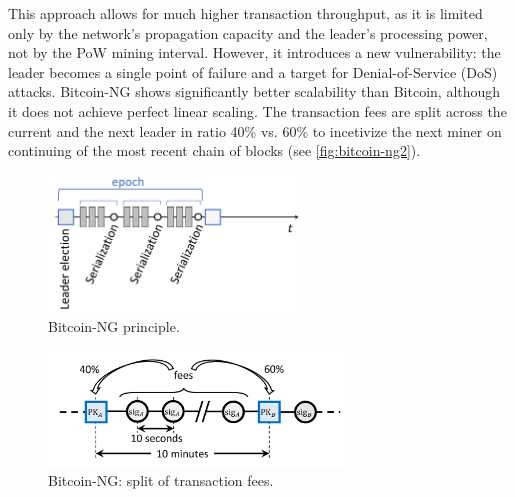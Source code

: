 
This approach allows for much higher transaction throughput, as it is
limited only by the network's propagation capacity and the leader's
processing power, not by the PoW mining interval. However, it introduces
a new vulnerability: the leader becomes a single point of failure and a
target for Denial-of-Service (DoS) attacks. 
Bitcoin-NG shows significantly better scalability
than Bitcoin, although it does not achieve perfect linear scaling.
The transaction fees are split across the current and the next leader in ratio 40\% vs. 60\% to incetivize the next miner on continuing of the most recent chain of blocks (see \autoref{fig:bitcoin-ng2}).



\begin{figure}[t]
	\begin{center}
		\includegraphics[width=0.6\textwidth]{./figs/bitcoin-ng.png}
		\caption{Bitcoin-NG principle.}		
		\label{fig:bitcoin-ng}
	\end{center}	
\end{figure}


\begin{figure}[b]
	\begin{center}
		\includegraphics[width=0.7\textwidth]{./figs/bitcoin-ng2.png}
		\caption{Bitcoin-NG: split of transaction fees.}		
		\label{fig:bitcoin-ng2}
	\end{center}	
\end{figure}




